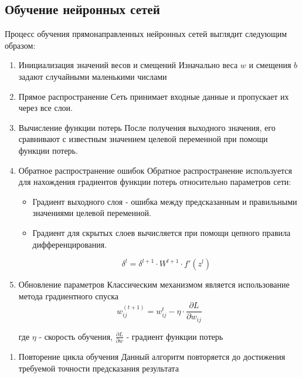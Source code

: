 {\subsection{Обучение нейронных сетей}

Процесс обучения прямонаправленных нейронных сетей выглядит следующим образом:
\begin{enumerate}
    \item Инициализация значений весов и смещений
          Изначально веса \(w\) и смещения \(b\) задают случайными маленькими числами
    \item Прямое распространение
          Сеть принимает входные данные и пропускает их через все слои.
    \item Вычисление функции потерь
          После получения выходного значения, его сравнивают с известным значением целевой переменной при
          помощи функции потерь.
    \item Обратное распространение ошибок
          Обратное распространение используется для нахождения градиентов функции потерь относительно
          параметров сети:
          \begin{itemize}
              \item Градиент выходного слоя - ошибка между предсказанным и правильными значениями целевой
                    переменной.
              \item Градиент для скрытых слоев вычисляется при помощи цепного правила дифференцирования.

                    \begin{equation}
                        \delta^{l} = \delta^{l + 1} \cdot W^{l + 1} \cdot f'(z^{l})
                    \end{equation}
          \end{itemize}

    \item Обновление параметров
          Классическим механизмом является использование метода градиентного спуска
          \begin{equation}
              w_{ij}^{(t+1)} = w_{ij}^{t} - \eta \cdot \frac{\partial L}{\partial w_{ij}}
          \end{equation}

          где \(\eta\) - скорость обучения, \(\frac{\partial L}{\partial w}\) - градиент функции потерь
\end{enumerate}


\begin{enumerate}
    \item Повторение цикла обучения
          Данный алгоритм повторяется до достижения требуемой точности предсказания результата
\end{enumerate}
}
